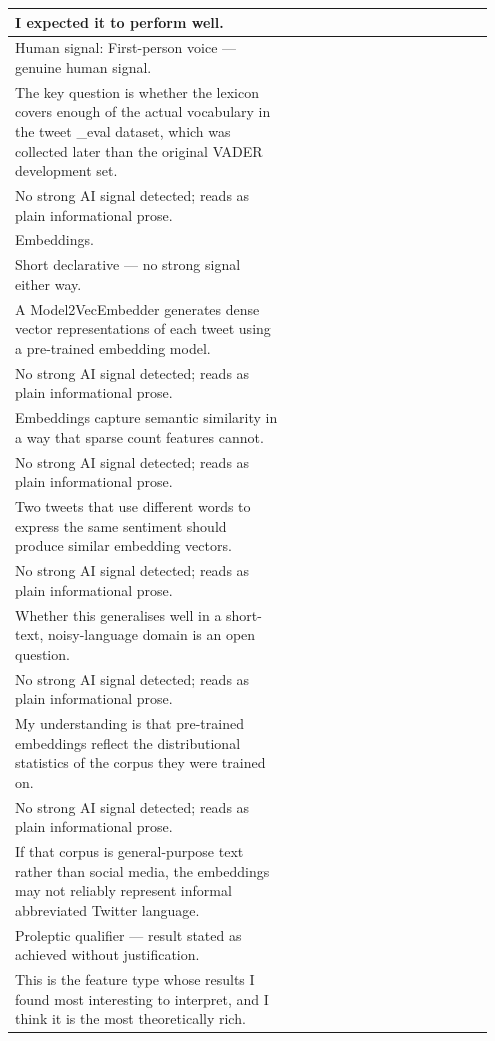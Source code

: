 \documentclass[11pt]{article}
\begin{document}
\begin{longtable}{|p{0.55\linewidth}|p{0.40\linewidth}|}
\hline
I expected it to perform well. & \\[2pt]
\hline
Human signal: First-person voice --- genuine human signal. & \\
\hline
The key question is whether the lexicon covers enough of the actual vocabulary in the tweet \_eval dataset, which was collected later than the original VADER development set. & \\[2pt]
\hline
No strong AI signal detected; reads as plain informational prose. & \\
\hline
Embeddings. & \\[2pt]
\hline
Short declarative --- no strong signal either way. & \\
\hline
A Model2VecEmbedder generates dense vector representations of each tweet using a pre-trained embedding model. & \\[2pt]
\hline
No strong AI signal detected; reads as plain informational prose. & \\
\hline
Embeddings capture semantic similarity in a way that sparse count features cannot. & \\[2pt]
\hline
No strong AI signal detected; reads as plain informational prose. & \\
\hline
Two tweets that use different words to express the same sentiment should produce similar embedding vectors. & \\[2pt]
\hline
No strong AI signal detected; reads as plain informational prose. & \\
\hline
Whether this generalises well in a short-text, noisy-language domain is an open question. & \\[2pt]
\hline
No strong AI signal detected; reads as plain informational prose. & \\
\hline
My understanding is that pre-trained embeddings reflect the distributional statistics of the corpus they were trained on. & \\[2pt]
\hline
No strong AI signal detected; reads as plain informational prose. & \\
\hline
If that corpus is general-purpose text rather than social media, the embeddings may not reliably represent informal abbreviated Twitter language. & \\[2pt]
\hline
Proleptic qualifier --- result stated as achieved without justification. & \\
\hline
This is the feature type whose results I found most interesting to interpret, and I think it is the most theoretically rich. & \\[2pt]

\end{longtable}
\end{document}
